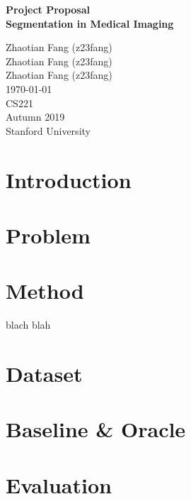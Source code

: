 \documentclass[12pt]{article}
\begin{document}
    
\begin{titlepage}
    \centering
    \vspace*{2.5cm}
    
    \Huge
    \textbf{Project Proposal} \\
    
    \huge
    \textbf{Segmentation in Medical Imaging}
    
    \vfill
    
    \LARGE
    Zhaotian Fang (z23fang) \\
    Zhaotian Fang (z23fang) \\
    Zhaotian Fang (z23fang) \\
    \today \\
    CS221 \\
    Autumn 2019 \\
    Stanford University
\end{titlepage}

\section{Introduction}

\section{Problem}

\section{Method}

blach blah \cite{pham:hal-01895163}

\section{Dataset}

\section{Baseline \& Oracle}

\section{Evaluation}



\end{document}
